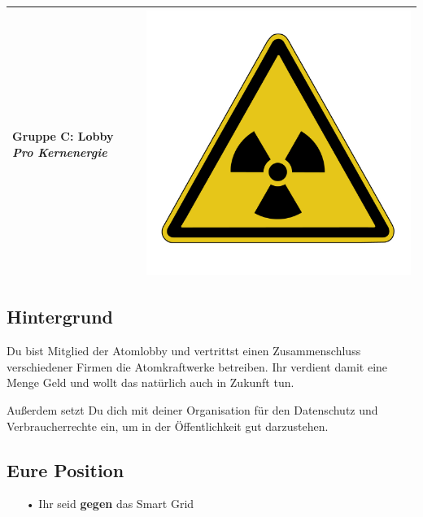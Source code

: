 \documentclass[11pt,a4paper,DIV=10,parskip=half,BCOR=0mm]{scrartcl}
\begin{document}
%
\setlength{\tabcolsep}{0mm} %
\begin{tabularx}{\linewidth}{lXr}
{\Large\textsf{\textbf{Gruppe C:} Lobby \textit{Pro Kernenergie}}} & & \includegraphics[scale=0.04]{images/atom}\\
\hline
\end{tabularx}
%
\subsection*{Hintergrund}
Du bist Mitglied der Atomlobby  und vertrittst einen Zusammenschluss
verschiedener Firmen die Atomkraftwerke betreiben. Ihr verdient damit
eine Menge Geld und wollt das natürlich auch in Zukunft tun.

Außerdem setzt Du dich mit deiner Organisation für den Datenschutz und
Verbraucherrechte ein, um in der Öffentlichkeit gut darzustehen.
\subsection*{Eure Position}
\begin{enumerate}
	\item[•]Ihr seid \textbf{gegen} das Smart Grid
\end{enumerate}
\end{document}
